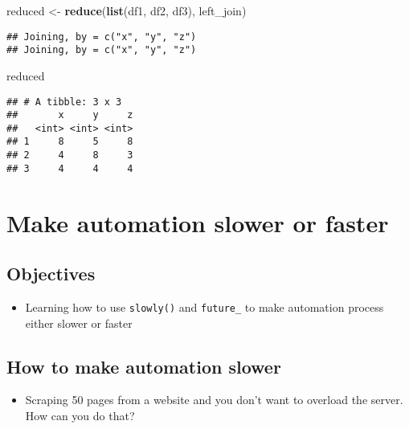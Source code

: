 \documentclass[
]{book}
\newenvironment{Shaded}{\begin{snugshade}}{\end{snugshade}}
\newcommand{\KeywordTok}[1]{\textcolor[rgb]{0.13,0.29,0.53}{\textbf{#1}}}
\newcommand{\NormalTok}[1]{#1}
\newcommand{\StringTok}[1]{\textcolor[rgb]{0.31,0.60,0.02}{#1}}
\providecommand{\tightlist}{%
  \setlength{\itemsep}{0pt}\setlength{\parskip}{0pt}}
\begin{document}
\begin{Shaded}
\begin{Highlighting}[]
\NormalTok{reduced \textless{}{-}}\StringTok{ }\KeywordTok{reduce}\NormalTok{(}\KeywordTok{list}\NormalTok{(df1, df2, df3), left\_join)}
\end{Highlighting}
\end{Shaded}

\begin{verbatim}
## Joining, by = c("x", "y", "z")
## Joining, by = c("x", "y", "z")
\end{verbatim}

\begin{Shaded}
\begin{Highlighting}[]
\NormalTok{reduced}
\end{Highlighting}
\end{Shaded}

\begin{verbatim}
## # A tibble: 3 x 3
##       x     y     z
##   <int> <int> <int>
## 1     8     5     8
## 2     4     8     3
## 3     4     4     4
\end{verbatim}

\hypertarget{make-automation-slower-or-faster}{%
\section{Make automation slower or faster}\label{make-automation-slower-or-faster}}

\hypertarget{objectives-2}{%
\subsection{Objectives}\label{objectives-2}}

\begin{itemize}
\tightlist
\item
  Learning how to use \texttt{slowly()} and \texttt{future\_} to make automation process either slower or faster
\end{itemize}

\hypertarget{how-to-make-automation-slower}{%
\subsection{How to make automation slower}\label{how-to-make-automation-slower}}

\begin{itemize}
\tightlist
\item
  Scraping 50 pages from a website and you don't want to overload the server. How can you do that?
\end{itemize}
\end{document}
